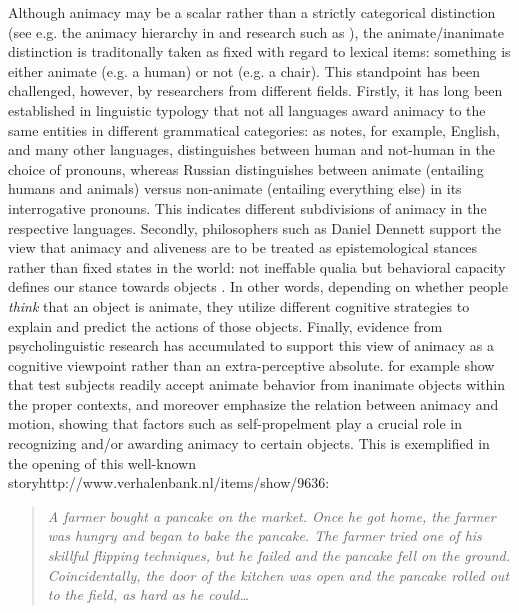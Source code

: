 \documentclass[a4paper,UKenglish]{oasics}
\begin{document}
Although animacy may be a scalar rather than a
strictly categorical distinction (see e.g. the animacy hierarchy in
\cite{comrie:89} and research such as \cite{rosenbach:08}), the
animate/inanimate distinction is traditonally taken as fixed with regard to lexical
items: something is either animate (e.g. a human) or not (e.g. a chair). This standpoint has been challenged, however, by researchers
from different fields. Firstly, it has long been established in
linguistic typology that not all languages award animacy to the same
entities in different grammatical categories: as \cite{comrie:89} notes, for
example, English, and many other languages, distinguishes
between human and not-human in the choice of pronouns, whereas Russian
distinguishes between animate (entailing humans and animals) versus
non-animate (entailing everything else) in its interrogative pronouns. This indicates different
subdivisions of animacy in the respective languages. Secondly,
philosophers such as Daniel Dennett support the view that animacy and
aliveness are to be treated as epistemological stances rather than
fixed states in the world: not ineffable qualia but behavioral
capacity defines our stance towards objects \cite{dennett:96}. In
other words, depending on whether people \textit{think} that an object
is animate, they utilize different cognitive strategies to explain and
predict the actions of those objects. Finally, evidence from
psycholinguistic research has accumulated to support this view of
animacy as a cognitive viewpoint rather than an extra-perceptive
absolute. \cite{nieuwland:05} for example show that test subjects
readily accept animate behavior from inanimate objects within the
proper contexts, and \cite{vogels:13} moreover emphasize the relation
between animacy and motion, showing that factors such as
self-propelment play a crucial role in recognizing and/or awarding
animacy to certain objects. This is exemplified in the opening of this
well-known storyhttp://www.verhalenbank.nl/items/show/9636:

\begin{quotation} {\it A farmer bought a pancake on the market. Once
    he got home, the farmer was hungry and began to bake the
    pancake. The farmer tried one of his skillful flipping techniques,
    but he failed and the pancake fell on the ground. Coincidentally,
    the door of the kitchen was open and the pancake rolled out to the
    field, as hard as he could\ldots}
\end{quotation}
\end{document}
